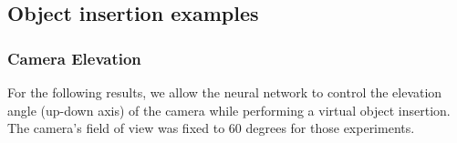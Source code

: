\FloatBarrier
\clearpage

\protect\hypertarget{camparaminsertionex}{}{}

\hypertarget{object-insertion-examples}{%
\subsection{Object insertion
examples}\label{object-insertion-examples}}

\subsubsection{Camera Elevation}

For the following results, we allow the neural network to control the
elevation angle (up-down axis) of the camera while performing a virtual
object insertion. The camera's field of view was fixed to 60 degrees for
those experiments.

